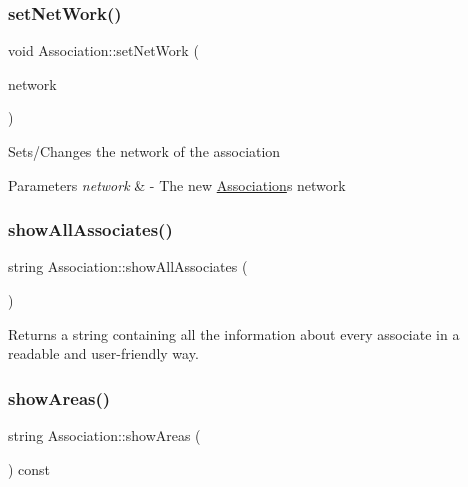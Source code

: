 \subsubsection{\texorpdfstring{set\+Net\+Work()}{setNetWork()}}
{\footnotesize\ttfamily void Association\+::set\+Net\+Work (\begin{DoxyParamCaption}\item[{\hyperlink{classNetwork}{Network} $\ast$}]{network }\end{DoxyParamCaption})}

Sets/\+Changes the network of the association


\begin{DoxyParams}{Parameters}
{\em network} & -\/ The new \hyperlink{classAssociation}{Association}\textquotesingle{}s network \\
\hline
\end{DoxyParams}
\mbox{\label{classAssociation_a266f2b14cd40429396b93ca29abcbf0c}} 
\subsubsection{\texorpdfstring{show\+All\+Associates()}{showAllAssociates()}}
{\footnotesize\ttfamily string Association\+::show\+All\+Associates (\begin{DoxyParamCaption}{ }\end{DoxyParamCaption})}



Returns a string containing all the information about every associate in a readable and user-\/friendly way. 

\mbox{\label{classAssociation_a149a29d7d7b59d15dadd84a2289c87e4}} 
\subsubsection{\texorpdfstring{show\+Areas()}{showAreas()}}
{\footnotesize\ttfamily string Association\+::show\+Areas (\begin{DoxyParamCaption}{ }\end{DoxyParamCaption}) const}




